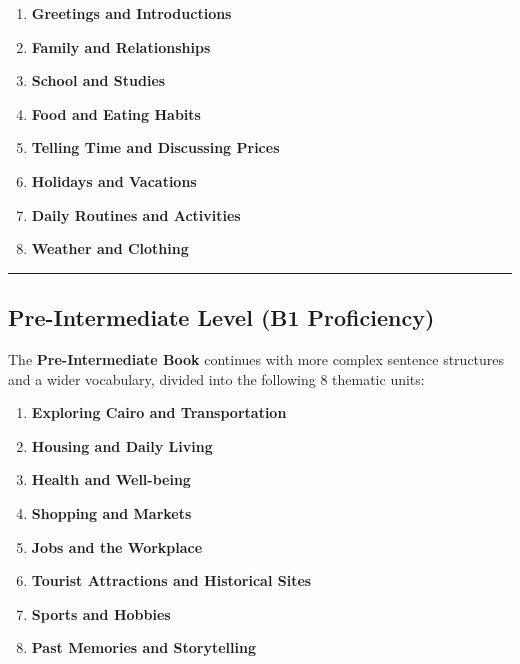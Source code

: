 \documentclass[
  a4paper,
  DIV=11,
  numbers=noendperiod]{scrartcl}
\providecommand{\tightlist}{%
  \setlength{\itemsep}{0pt}\setlength{\parskip}{0pt}}
\begin{document}
\begin{enumerate}
\def\labelenumi{\arabic{enumi}.}
\tightlist
\item
  \textbf{Greetings and Introductions}\\
\item
  \textbf{Family and Relationships}\\
\item
  \textbf{School and Studies}\\
\item
  \textbf{Food and Eating Habits}\\
\item
  \textbf{Telling Time and Discussing Prices}\\
\item
  \textbf{Holidays and Vacations}\\
\item
  \textbf{Daily Routines and Activities}\\
\item
  \textbf{Weather and Clothing}
\end{enumerate}

\begin{center}\rule{0.5\linewidth}{0.5pt}\end{center}

\subsection{Pre-Intermediate Level (B1
Proficiency)}\label{pre-intermediate-level-b1-proficiency}

The \textbf{Pre-Intermediate Book} continues with more complex sentence
structures and a wider vocabulary, divided into the following 8 thematic
units:

\begin{enumerate}
\def\labelenumi{\arabic{enumi}.}
\tightlist
\item
  \textbf{Exploring Cairo and Transportation}\\
\item
  \textbf{Housing and Daily Living}\\
\item
  \textbf{Health and Well-being}\\
\item
  \textbf{Shopping and Markets}\\
\item
  \textbf{Jobs and the Workplace}\\
\item
  \textbf{Tourist Attractions and Historical Sites}\\
\item
  \textbf{Sports and Hobbies}\\
\item
  \textbf{Past Memories and Storytelling}
\end{enumerate}
\end{document}
